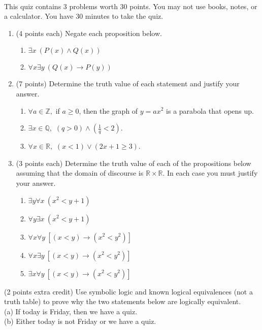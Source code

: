 \documentclass[12pt]{article}
\def\RR{{\mathbb R}}
\def\ZZ{{\mathbb Z}}
\def\QQ{{\mathbb Q}}
\newcommand{\be}{\begin{enumerate}}
\newcommand{\ee}{\end{enumerate}}
\begin{document}
\thispagestyle{fancy}


\\

\noindent This quiz contains 3 problems worth 30 points. You may not use books, notes, or a calculator. You have 30 minutes to take the quiz.\\

\noindent \hrulefill
\be
\item (4 points each) Negate each  proposition below.
\be 
\item $\exists x ~(P(x) \wedge Q(x))$
\vfill
\item $\forall x \exists y ~ (Q(x) \rightarrow P(y))$
\vfill
\ee
\item (7 points) Determine the truth value of each statement and justify your answer.
\be
\item $\forall a \in \ZZ,$ if $a\geq 0$, then the graph of $y=ax^2$ is a parabola that opens up.\\
\vfill
\item $\exists x \in \QQ,$ $(q > 0) \wedge (\frac{1}{q} < 2).$
\vfill
\item $\forall x \in \RR,$ $(x < 1) \vee (2x+1 \geq 3).$
\vfill
\ee


\newpage
\item (3 points each) Determine the truth value of each of the propositions below assuming that the domain of discourse is $\RR \times \RR.$ In each case you must justify your answer.
\be
\item $\exists y \forall x ~(x^2 < y+1)$
\vfill
\item $\forall y \exists x ~(x^2 < y+1)$
\vfill
\item $\forall x \forall y ~[(x < y) \rightarrow (x^2 < y^2)]$
\vfill
\item $\forall x \exists y ~[(x < y) \rightarrow (x^2 < y^2)]$
\vfill
\item $\exists x \forall y ~[(x <y) \rightarrow (x^2 < y^2)]$
\vfill
\ee
\ee

(2 points extra credit) Use symbolic logic and known logical equivalences  (not a truth table) to prove why the two statements below are logically equivalent. \\
(a) If today is Friday, then we  have a quiz.\\
(b) Either today is not Friday or we have a quiz.\\
\vspace{1in}
\end{document}
